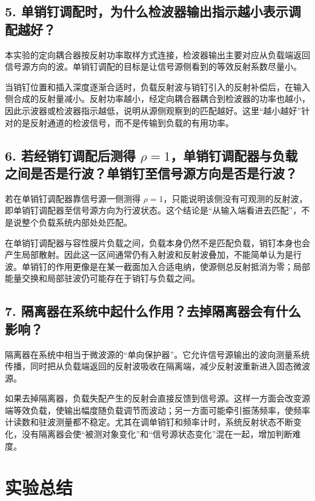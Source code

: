 \documentclass[UTF8]{ctexart}
\begin{document}
\subsection*{5. 单销钉调配时，为什么检波器输出指示越小表示调配越好？}

本实验的定向耦合器按反射功率取样方式连接，检波器输出主要对应从负载端返回信号源方向的波。单销钉调配的目标是让信号源侧看到的等效反射系数尽量小。

当销钉位置和插入深度逐渐合适时，负载反射波与销钉引入的反射补偿后，在输入侧合成的反射量减小。反射功率越小，经定向耦合器耦合到检波器的功率也越小，因此示波器或检波器指示越低，说明从源侧观察到的匹配越好。这里“越小越好”针对的是反射通道的检波信号，而不是传输到负载的有用功率。

\subsection*{6. 若经销钉调配后测得 $\rho=1$，单销钉调配器与负载之间是否是行波？单销钉至信号源方向是否是行波？}

若在单销钉调配器靠信号源一侧测得 $\rho=1$，只能说明该侧没有可观测的反射波，即单销钉调配器至信号源方向为行波状态。这个结论是“从输入端看进去匹配”，不是说整个负载系统内部处处匹配。

在单销钉调配器与容性膜片负载之间，负载本身仍然不是匹配负载，销钉本身也会产生局部散射。因此这一区间通常仍有入射波和反射波叠加，不能简单认为是行波。单销钉的作用更像是在某一截面加入合适电纳，使源侧总反射抵消为零；局部能量交换和局部驻波仍可能存在于销钉与负载之间。

\subsection*{7. 隔离器在系统中起什么作用？去掉隔离器会有什么影响？}

隔离器在系统中相当于微波源的“单向保护器”。它允许信号源输出的波向测量系统传播，同时把从负载端返回的反射波吸收在隔离端，减少反射波重新进入固态微波源。

如果去掉隔离器，负载失配产生的反射会直接反馈到信号源。这样一方面会改变源端等效负载，使输出幅度随负载调节而波动；另一方面可能牵引振荡频率，使频率计读数和驻波测量都不稳定。尤其在调单销钉和频率计时，系统反射状态不断变化，没有隔离器会使“被测对象变化”和“信号源状态变化”混在一起，增加判断难度。

\section{实验总结}
\end{document}
